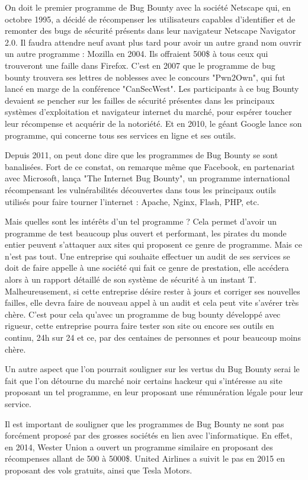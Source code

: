 \documentclass[a4paper]{memoir}
\begin{document}
On doit le premier programme de Bug Bounty avec la société Netscape qui, en octobre 1995, a décidé de récompenser les utilisateurs capables d'identifier et de remonter des bugs de sécurité présents dans leur navigateur Netscape Navigator 2.0. Il faudra attendre neuf avant plus tard pour avoir un autre grand nom ouvrir un autre programme : Mozilla en 2004. Ils offraient 500\$ à tous ceux qui trouveront une faille dans Firefox.
C'est en 2007 que le programme de bug bounty trouvera ses lettres de noblesses avec le concours "Pwn2Own", qui fut lancé en marge de la conférence "CanSecWest". Les participants à ce bug Bounty devaient se pencher sur les failles de sécurité présentes dans les principaux systèmes d'exploitation et navigateur internet du marché, pour espérer toucher leur récompense et acquérir de la notoriété.
Et en 2010, le géant Google lance son programme, qui concerne tous ses services en ligne et ses outils. 

Depuis 2011, on peut donc dire que les programmes de Bug Bounty se sont banalisées. Fort de ce constat, on remarque même que Facebook, en partenariat avec Microsoft, lança "The Internet Bug Bounty", un programme international récompensant les vulnérabilités découvertes dans tous les principaux outils utilisés pour faire tourner l'internet : Apache, Nginx, Flash, PHP, etc.

Mais quelles sont les intérêts d'un tel programme ?
Cela permet d'avoir un programme de test beaucoup plus ouvert et performant, les pirates du monde entier peuvent s'attaquer aux sites qui proposent ce genre de programme. Mais ce n'est pas tout. 
Une entreprise qui souhaite effectuer un audit de ses services se doit de faire appelle à une société qui fait ce genre de prestation, elle accédera alors à un rapport détaillé de son système de sécurité à un instant T. Malheureusement, si cette entreprise désire rester à jours et corriger ses nouvelles failles, elle devra faire de nouveau appel à un audit et cela peut vite s'avérer très chère.
C'est pour cela qu'avec un programme de bug bounty développé avec rigueur, cette entreprise pourra faire tester son site ou encore ses outils en continu, 24h sur 24 et ce, par des centaines de personnes et pour beaucoup moins chère.

Un autre aspect que l'on pourrait souligner sur les vertus du Bug Bounty serai le fait que l'on détourne du marché noir certains hackeur qui s'intéresse au site proposant un tel programme, en leur proposant une rémunération légale pour leur service.

Il est important de souligner que les programmes de Bug Bounty ne sont pas forcément proposé par des grosses sociétés en lien avec l'informatique. En effet, en 2014, Wester Union a ouvert un programme similaire en proposant des récompenses allant de 500 à 5000\$. United Airlines a suivit le pas en 2015 en proposant des vols gratuits, ainsi que Tesla Motors.
\end{document}
